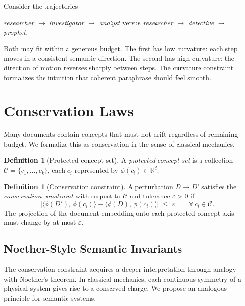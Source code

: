 \documentclass[12pt, a4paper]{article}
\theoremstyle{plain}
\theoremstyle{definition}
\newtheorem{definition}[theorem]{Definition}
\theoremstyle{remark}
\newcommand{\bR}{\mathbb{R}}
\newcommand{\ve}{\varepsilon}
\newcommand{\inner}[2]{\langle #1,\, #2 \rangle}
\begin{document}
Consider the trajectories
\begin{center}
\emph{researcher} $\to$ \emph{investigator} $\to$ \emph{analyst}
\quad versus \quad
\emph{researcher} $\to$ \emph{detective} $\to$ \emph{prophet.}
\end{center}
Both may fit within a generous budget.  The first has low curvature: each step
moves in a consistent semantic direction.  The second has high curvature:
the direction of motion reverses sharply between steps.  The curvature
constraint formalizes the intuition that coherent paraphrase should feel smooth.


\section{Conservation Laws}
\label{sec:conservation}

Many documents contain concepts that must not drift regardless of remaining
budget.  We formalize this as conservation in the sense of classical mechanics.

\begin{definition}[Protected concept set]
\label{def:protected}
A \emph{protected concept set} is a collection
$\mathcal{C} = \{c_1, \ldots, c_k\}$,
each $c_i$ represented by $\phi(c_i) \in \bR^d$.
\end{definition}

\begin{definition}[Conservation constraint]
\label{def:conservation}
A perturbation $D \to D'$ satisfies the \emph{conservation constraint} with
respect to $\mathcal{C}$ and tolerance $\ve > 0$ if
\[
   \bigl|\inner{\phi(D')}{\phi(c_i)} - \inner{\phi(D)}{\phi(c_i)}\bigr|
   \;\le\; \ve
   \qquad \forall\, c_i \in \mathcal{C}.
\]
The projection of the document embedding onto each protected concept axis
must change by at most $\ve$.
\end{definition}

\subsection{Noether-Style Semantic Invariants}

The conservation constraint acquires a deeper interpretation through analogy
with Noether's theorem.  In classical mechanics, each continuous symmetry of
a physical system gives rise to a conserved charge.  We propose an analogous
principle for semantic systems.
\end{document}
